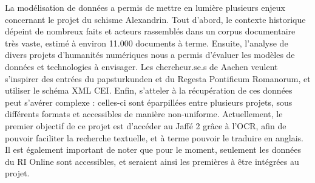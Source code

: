 La modélisation de données a permis de mettre en lumière plusieurs enjeux concernant le projet du schisme Alexandrin. Tout d’abord, le contexte historique dépeint de nombreux faits et acteurs rassemblés dans un corpus documentaire très vaste, estimé à environ 11.000 documents à terme. Ensuite, l’analyse de divers projets d’humanités numériques nous a permis d’évaluer les modèles de données et technologies à envisager. Les chercheur.se.s de Aachen veulent s’inspirer des entrées du papsturkunden et du Regesta Pontificum Romanorum, et utiliser le schéma XML CEI. Enfin, s’atteler à la récupération de ces données peut s'avérer complexe :  celles-ci sont éparpillées entre plusieurs projets, sous différents formats et accessibles de manière non-uniforme. Actuellement, le premier objectif de ce projet est d’accéder au Jaffé 2 grâce à l’OCR, afin de pouvoir faciliter la recherche textuelle, et à terme pouvoir le traduire en anglais. Il est également important de noter que pour le moment, seulement les données du RI Online sont accessibles, et seraient ainsi les premières à être intégrées au projet.